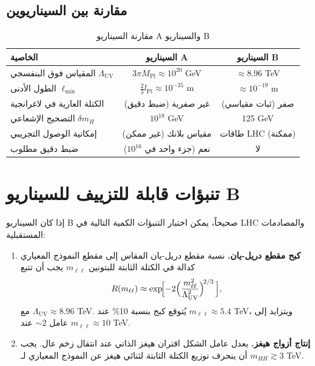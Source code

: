 \documentclass[11pt,a4paper]{article}
\newcommand{\Mpl}{M_{\mathrm{Pl}}}
\newcommand{\Lpl}{l_{\mathrm{Pl}}}
\newcommand{\Lmin}{\ell_{\min}}
\newcommand{\LUV}{\Lambda_{\mathrm{UV}}}
\theoremstyle{remark}
\begin{document}
\begin{otherlanguage}{arabic}
		\subsection{مقارنة بين السيناريوين}
		\begin{table}[H]
			\centering
			\caption{مقارنة السيناريو A والسيناريو B}
			\label{tab:scenarios}
			\small
			\begin{tabular}{@{}lcc@{}}
				\toprule
				\textbf{الخاصية} & \textbf{السيناريو A} & \textbf{السيناريو B} \\
				\midrule
				المقياس فوق البنفسجي \(\LUV\) & \(3\pi\Mpl \approx 10^{20}\) GeV & \(\approx 8.96\) TeV \\
				الطول الأدنى \(\Lmin\) & \(\frac{2}{3}\Lpl \approx 10^{-35}\) m & \(\approx 10^{-19}\) m \\
				الكتلة العارية في لاغرانجية & غير صفرية (ضبط دقيق) & صفر (ثبات مقياسي) \\
				التصحيح الإشعاعي \(\delta m_H\) & \(10^{18}\) GeV & 125 GeV \\
				إمكانية الوصول التجريبي & مقياس بلانك (غير ممكن) & طاقات LHC (ممكنة) \\
				ضبط دقيق مطلوب & نعم (جزء واحد في \(10^{16}\)) & لا \\
				\bottomrule
			\end{tabular}
		\end{table}
		
		\section{تنبؤات قابلة للتزييف للسيناريو B}
		\label{sec:predictions}
		
		إذا كان السيناريو B صحيحاً، يمكن اختبار التنبؤات الكمية التالية في LHC والمصادمات المستقبلية:
		
		\begin{enumerate}[label=(\arabic*)]
			\item \textbf{كبح مقطع دريل-يان.} نسبة مقطع دريل-يان المقاس إلى مقطع النموذج المعياري كدالة في الكتلة الثابتة للبتونين \(m_{\ell\ell}\) يجب أن تتبع
			\[
			R(m_{\ell\ell}) \approx \exp\!\Bigl[-2\Bigl(\frac{m_{\ell\ell}^2}{\LUV^2}\Bigr)^{\!2/3}\,\Bigr],
			\]
			مع \(\LUV \approx 8.96\) TeV. يُتوقع كبح بنسبة 10\% عند \(m_{\ell\ell} \approx 5.4\) TeV، ويتزايد إلى عامل \(\sim 2\) عند \(m_{\ell\ell} \approx 10\) TeV.
			
			\item \textbf{إنتاج أزواج هيغز.} يعدل عامل الشكل اقتران هيغز الذاتي عند انتقال زخم عال. يجب أن ينحرف توزيع الكتلة الثابتة لثنائي هيغز عن النموذج المعياري لـ \(m_{HH} \gtrsim 3\) TeV.
			

\end{enumerate}
\end{otherlanguage}
\end{document}

